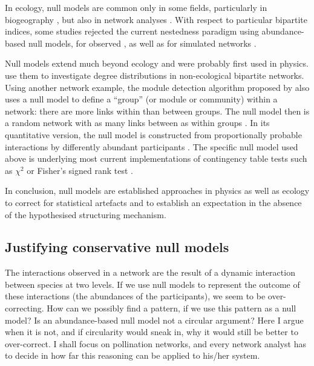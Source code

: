 \documentclass[a4paper, 11pt]{article}\usepackage[]{graphicx}\usepackage[]{color}
\newcommand{\ind}[1]{#1\index{#1}}           			   %
\begin{document}
In ecology, \ind{null model}s are common only in some fields, particularly in biogeography \citep{Gotelli1996,Hausdorf2007}, but also in network analyses \citep{Dormann2009,Joppa2009,Bluthgen2008,Vazquez2006,Vazquez2003a,Vazquez2009}. With respect to particular bipartite indices, some studies rejected the current nestedness paradigm using abundance-based null models, for observed \citep{Kallimanis2009,Moore2007,Santamaria2007}, as well as for simulated networks \citep{Krishna2008}.

Null models extend much beyond ecology and were probably first used in physics. \citet{Latapy2008} use them to investigate degree distributions in non-ecological bipartite networks. Using another network example, the module detection algorithm proposed by \citet{Newman2004} also uses a null model to define a ``group'' (or module or community) within a network: there are more links within than between groups. The null model then is a random network with as many links between as within groups \citep{Guimera2005}. In its quantitative version, the null model is constructed from proportionally probable interactions by differently abundant participants \citep{Barber2004}. The specific null model used above is underlying most current implementations of contingency table tests such as $\chi^2$ or Fisher's signed rank test \citep{Patefield1981}.

In conclusion, null models are established approaches in physics as well as ecology to correct for statistical artefacts and to establish an expectation in the absence of the hypothesised structuring mechanism.

\subsection{Justifying conservative null models}
The interactions observed in a network are the result of a dynamic interaction between species at two levels. If we use null models to represent the outcome of these interactions (the abundances of the participants), we seem to be over-correcting. How can we possibly find a pattern, if we use this pattern as a null model? Is an abundance-based null model not a circular argument? Here I argue when it is not, and if \ind{circularity} would sneak in, why it would still be better to over-correct. I shall focus on pollination networks, and every network analyst has to decide in how far this reasoning can be applied to his/her system.
\end{document}

